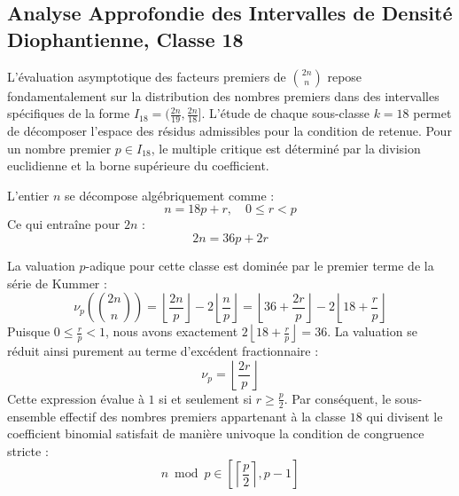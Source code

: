 \documentclass[12pt,a4paper]{article}
\begin{document}
    \newpage
    \subsection{Analyse Approfondie des Intervalles de Densité Diophantienne, Classe 18}
    L'évaluation asymptotique des facteurs premiers de $\binom{2n}{n}$ repose fondamentalement sur la distribution des nombres premiers dans des intervalles spécifiques de la forme $I_18 = (\frac{2n}{19}, \frac{2n}{18}]$.
    L'étude de chaque sous-classe $k = 18$ permet de décomposer l'espace des résidus admissibles pour la condition de retenue.
    Pour un nombre premier $p \in I_18$, le multiple critique est déterminé par la division euclidienne et la borne supérieure du coefficient.

    L'entier $n$ se décompose algébriquement comme :
    \begin{equation}
    n = 18 p + r, \quad 0 \le r < p
    \end{equation}
    Ce qui entraîne pour $2n$ :
    \begin{equation}
    2n = 36 p + 2r
    \end{equation}

    La valuation $p$-adique pour cette classe est dominée par le premier terme de la série de Kummer :
    \begin{equation}
    \nu_p\left( \binom{2n}{n} \right) = \left\lfloor \frac{2n}{p} \right\rfloor - 2 \left\lfloor \frac{n}{p} \right\rfloor = \left\lfloor 36 + \frac{2r}{p} \right\rfloor - 2 \left\lfloor 18 + \frac{r}{p} \right\rfloor
    \end{equation}
    Puisque $0 \le \frac{r}{p} < 1$, nous avons exactement $2 \left\lfloor 18 + \frac{r}{p} \right\rfloor = 36$.
    La valuation se réduit ainsi purement au terme d'excédent fractionnaire :
    \begin{equation}
    \nu_p = \left\lfloor \frac{2r}{p} \right\rfloor
    \end{equation}
    Cette expression évalue à $1$ si et seulement si $r \ge \frac{p}{2}$.
    Par conséquent, le sous-ensemble effectif des nombres premiers appartenant à la classe $18$ qui divisent le coefficient binomial satisfait de manière univoque la condition de congruence stricte :
    \begin{equation}
    n \bmod p \in \left[ \left\lceil \frac{p}{2} \right\rceil, p - 1 \right]
    \end{equation}
\end{document}
